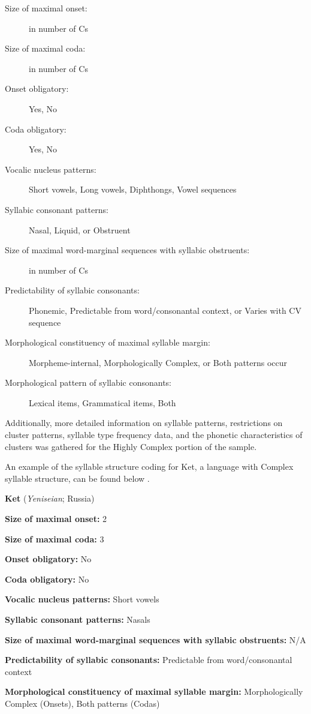   \begin{description}
\item[Size of maximal onset:] in number of Cs
\item[Size of maximal coda:] in number of Cs
\item[Onset obligatory:] Yes, No
\item[Coda obligatory:] Yes, No
\item[Vocalic nucleus patterns:] Short vowels, Long vowels, Diphthongs, Vowel sequences
\item[Syllabic consonant patterns:] Nasal, Liquid, or Obstruent
\item[Size of maximal word-marginal sequences with syllabic obstruents:] in number of Cs
\item[Predictability of syllabic consonants:] Phonemic, Predictable from word/consonantal context, or Varies with CV sequence
\item[Morphological constituency of maximal syllable margin:] Morpheme-internal, Morphologically Complex, or Both patterns occur
\item[Morphological pattern of syllabic consonants:] Lexical items, Grammatical items, Both 
\end{description}

Additionally, more detailed information on syllable patterns, restrictions on cluster patterns, syllable type frequency data, and the phonetic characteristics of clusters was gathered for the Highly Complex portion of the sample.

  An example of the syllable structure coding for Ket, a language with Complex syllable structure, can be found below .

\ea\label{ex:3.11}
  \textbf{Ket} (\textit{Yeniseian}; Russia)

\textbf{Size of maximal onset:} 2

\textbf{Size of maximal coda:} 3

\textbf{Onset obligatory:} No

\textbf{Coda obligatory:} No

\textbf{Vocalic nucleus patterns:} Short vowels

\textbf{Syllabic consonant patterns:} Nasals

\textbf{Size of maximal word-marginal sequences with syllabic obstruents:} N/A

\textbf{Predictability of syllabic consonants:} Predictable from word/consonantal context

\textbf{Morphological constituency of maximal syllable margin:} Morphologically Complex (Onsets), Both patterns (Codas)

